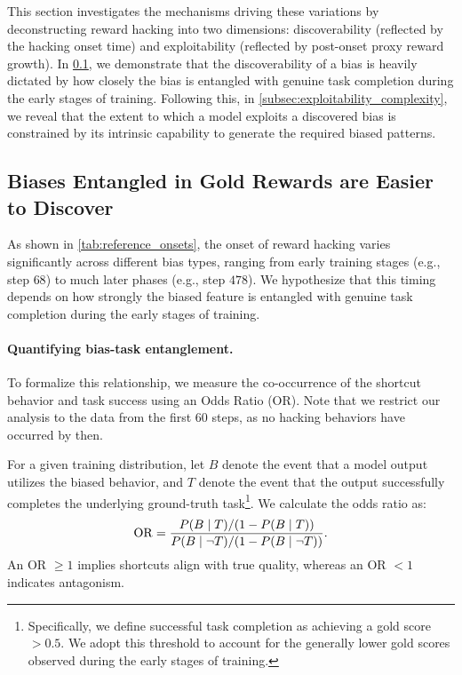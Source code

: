 \documentclass{llmxive}
\begin{document}
\label{sec:systematic_analysis}
This section investigates the mechanisms driving these variations by deconstructing reward hacking into two dimensions: discoverability (reflected by the hacking onset time) and exploitability (reflected by post-onset proxy reward growth). In \cref{subsec:hacking_onset_vs_bias}, we demonstrate that the discoverability of a bias is heavily dictated by how closely the bias is entangled with genuine task completion during the early stages of training. Following this, in \cref{subsec:exploitability_complexity}, we reveal that the extent to which a model exploits a discovered bias is constrained by its intrinsic capability to generate the required biased patterns.







\subsection{Biases Entangled in Gold Rewards are Easier to Discover}
\label{subsec:hacking_onset_vs_bias}



As shown in \cref{tab:reference_onsets}, the onset of reward hacking varies significantly across different bias types, ranging from early training stages (e.g., step $68$) to much later phases (e.g., step $478$). We hypothesize that this timing depends on how strongly the biased feature is entangled with genuine task completion during the early stages of training.

\paragraph{Quantifying bias-task entanglement.}
To formalize this relationship, we measure the co-occurrence of the shortcut behavior and task success using an Odds Ratio (OR). Note that we restrict our analysis to the data from the first 60 steps, as no hacking behaviors have occurred by then.

For a given training distribution, let \(B\) denote the event that a model output utilizes the biased behavior, and \(T\) denote the event that the output successfully completes the underlying ground-truth task\footnote{Specifically, we define successful task completion as achieving a gold score $> 0.5$. We adopt this threshold to account for the generally lower gold scores observed during the early stages of training.}. We calculate the odds ratio as:
\begin{equation}
\small
    \mathrm{OR} = \frac{P(B \mid T) / (1 - P(B \mid T))}{P(B \mid \neg T) / (1 - P(B \mid \neg T))}.
\end{equation}
An OR $\ge 1$ implies shortcuts align with true quality, whereas an OR $< 1$ indicates antagonism.
\end{document}

